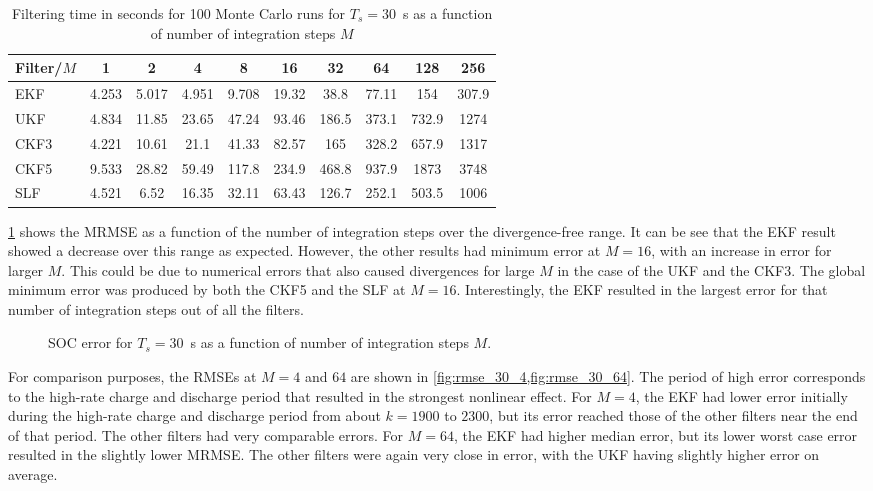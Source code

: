 \documentclass[../zhang_thesis.tex]{subfiles}
\begin{document}
\begin{table}[h]
\centering
\caption{Filtering time in seconds for 100 Monte Carlo runs for $T_s=30$~s as a function of number of integration steps $M$}
\begin{tabular}{@{}lccccccccc@{}}
\toprule
Filter/$M$ & 1     & 2     & 4     & 8     & 16    & 32    & 64    & 128   & 256   \\ \midrule
EKF        & 4.253 & 5.017 & 4.951 & 9.708 & 19.32 & 38.8  & 77.11 & 154   & 307.9 \\
UKF        & 4.834 & 11.85 & 23.65 & 47.24 & 93.46 & 186.5 & 373.1 & 732.9 & 1274  \\
CKF3       & 4.221 & 10.61 & 21.1  & 41.33 & 82.57 & 165   & 328.2 & 657.9 & 1317  \\
CKF5       & 9.533 & 28.82 & 59.49 & 117.8 & 234.9 & 468.8 & 937.9 & 1873  & 3748  \\
SLF        & 4.521 & 6.52  & 16.35 & 32.11 & 63.43 & 126.7 & 252.1 & 503.5 & 1006  \\ \bottomrule
\end{tabular}
\label{tab:time_30}
\end{table}

\cref{fig:mrmse_30} shows the MRMSE as a function of the number of integration steps over the divergence-free range. It can be see that the EKF result showed a decrease over this range as expected. However, the other results had minimum error at $M=16$, with an increase in error for larger $M$. This could be due to numerical errors that also caused divergences for large $M$ in the case of the UKF and the CKF3. The global minimum error was produced by both the CKF5 and the SLF at $M=16$.
Interestingly, the EKF resulted in the largest error for that number of integration steps out of all the filters.

\begin{figure}[ht]
\centering
%
\caption{SOC error for $T_s=30$~s as a function of number of integration steps $M$.}
\label{fig:mrmse_30}
\end{figure}

For comparison purposes, the RMSEs at $M=4$ and $64$ are shown in \cref{fig:rmse_30_4,fig:rmse_30_64}. The period of high error corresponds to the high-rate charge and discharge period that resulted in the strongest nonlinear effect. For $M=4$, the EKF had lower error initially during the high-rate charge and discharge period from about $k=1900$ to $2300$, but its error reached those of the other filters near the end of that period. The other filters had very comparable errors. For $M=64$, the EKF
had higher median error, but its lower worst case error resulted in the slightly lower MRMSE. The other filters were again very close in error, with the UKF having slightly higher error on average.
\end{document}
